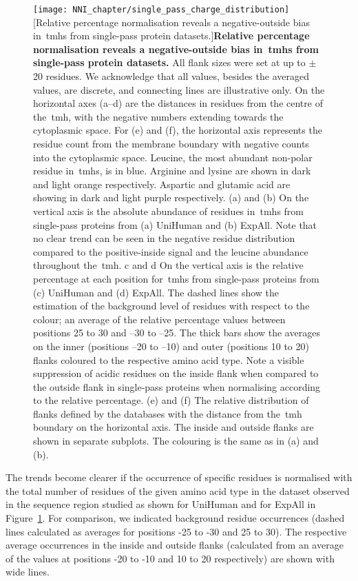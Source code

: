 \begin{figure}[p]
\centering
\texttt{[image: NNI\_chapter/single\_pass\_charge\_distribution]}
[Relative percentage normalisation reveals a negative-outside bias in~\gls{tmh}s from single-pass protein datasets.]{\textbf{Relative percentage normalisation reveals a negative-outside bias in~\gls{tmh}s from single-pass protein datasets.} All flank sizes were set at up to $\pm$20 residues.
We acknowledge that all values, besides the averaged values, are discrete, and connecting lines are illustrative only.
On the horizontal axes (a–d) are the distances in residues from the centre of the~\gls{tmh}, with the negative numbers extending towards the cytoplasmic space.
For (e) and (f), the horizontal axis represents the residue count from the membrane boundary with negative counts into the cytoplasmic space.
Leucine, the most abundant non-polar residue in~\gls{tmh}s, is in blue.
Arginine and lysine are shown in dark and light orange respectively.
Aspartic and glutamic acid are showing in dark and light purple respectively.
(a) and (b) On the vertical axis is the absolute abundance of residues in~\gls{tmh}s from single-pass proteins from (a) UniHuman and (b) ExpAll.
Note that no clear trend can be seen in the negative residue distribution compared to the positive-inside signal and the leucine abundance throughout the~\gls{tmh}.
c and d On the vertical axis is the relative percentage at each position for~\gls{tmh}s from single-pass proteins from (c) UniHuman and (d) ExpAll.
The dashed lines show the estimation of the background level of residues with respect to the colour; an average of the relative percentage values between positions 25 to 30 and –30 to –25.
The thick bars show the averages on the inner (positions –20 to –10) and outer (positions 10 to 20) flanks coloured to the respective amino acid type.
Note a visible suppression of acidic residues on the inside flank when compared to the outside flank in single-pass proteins when normalising according to the relative percentage.
(e) and (f) The relative distribution of flanks defined by the databases with the distance from the~\gls{tmh} boundary on the horizontal axis.
The inside and outside flanks are shown in separate subplots.
The colouring is the same as in (a) and (b).}


\label{fig:single_pass_charge_distribution}
\end{figure}

The trends become clearer if the occurrence of specific residues is normalised with the total number of residues of the given amino acid type in the dataset observed in the sequence region studied as shown for UniHuman and for ExpAll in Figure~\ref{fig:single_pass_charge_distribution}.
For comparison, we indicated background residue occurrences (dashed lines calculated as averages for positions -25 to -30 and 25 to 30).
The respective average occurrences in the inside and outside flanks (calculated from an average of the values at positions -20 to -10 and 10 to 20 respectively) are shown with wide lines.

